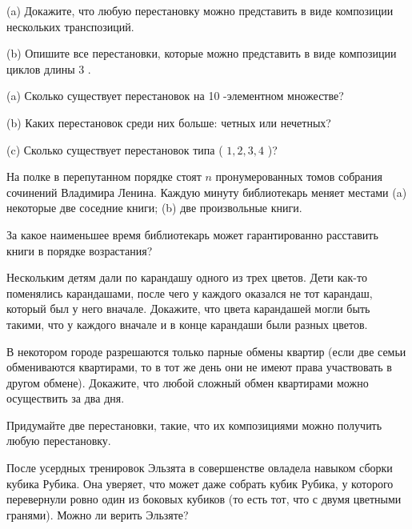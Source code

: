 (a) Докажите, что любую перестановку можно представить в виде композиции нескольких транспозиций.

\noindent
(b) Опишите все перестановки, которые можно представить в виде композиции циклов длины 3 .

(a) Сколько существует перестановок на 10 -элементном множестве?

\noindent
(b) Каких перестановок среди них больше: четных или нечетных?

\noindent
(c) Сколько существует перестановок типа ( $1,2,3,4$ )?

\noindent
На полке в перепутанном порядке стоят $n$ пронумерованных томов собрания сочинений Владимира Ленина. Каждую минуту библиотекарь меняет местами (a) некоторые две соседние книги; (b) две произвольные книги.

За какое наименьшее время библиотекарь может гарантированно расставить книги в порядке возрастания?

Нескольким детям дали по карандашу одного из трех цветов. Дети как-то поменялись карандашами, после чего у каждого оказался не тот карандаш, который был у него вначале. Докажите, что цвета карандашей могли быть такими, что у каждого вначале и в конце карандаши были разных цветов.

В некотором городе разрешаются только парные обмены квартир (если две семьи обмениваются квартирами, то в тот же день они не имеют права участвовать в другом обмене). Докажите, что любой сложный обмен квартирами можно осуществить за два дня.

Придумайте две перестановки, такие, что их композициями можно получить любую перестановку.

После усердных тренировок Эльзята в совершенстве овладела навыком сборки кубика Рубика. Она уверяет, что может даже собрать кубик Рубика, у которого перевернули ровно один из боковых кубиков (то есть тот, что с двумя цветными гранями). Можно ли верить Эльзяте?